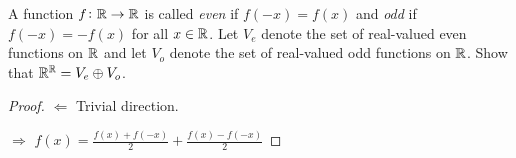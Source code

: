 \documentclass{extarticle}
\begin{document}
\begin{problem}{24}
    A function \(f \colon \mathbb{R} \to \mathbb{R}\) is called \emph{even} if \(f(-x)=f(x)\) and 
    \emph{odd} if \(f(-x) = -f(x)\) for all \(x \in \mathbb{R}\). Let \(V_e\) denote the 
    set of real-valued even functions on \(\mathbb{R}\) and let \(V_o\) denote the 
    set of real-valued odd functions on \(\mathbb{R}\). Show that \(\mathbb{R}^{\mathbb{R}} = V_e \oplus V_o\).
\end{problem}

\begin{proof}
\(\Leftarrow\) Trivial direction. 

\(\Rightarrow\) \(f(x) = \frac{f(x) + f(-x)}{2} + \frac{f(x) - f(-x)}{2}\)
\end{proof}
\end{document}
